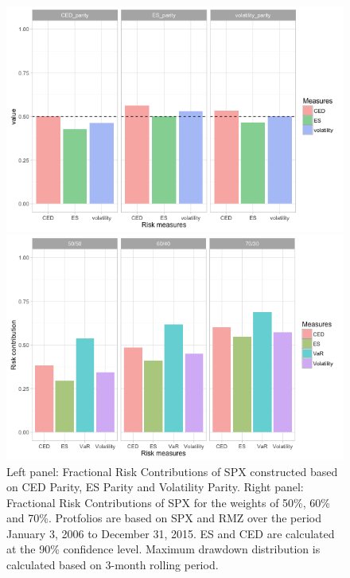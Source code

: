 \documentclass[11pt]{article}
\begin{document}
\begin{figure}[H]
  \centering
  \begin{minipage}[b]{0.48\textwidth}
    \includegraphics[width = 1\textwidth]{../figures/risk_contribution/risk_parity}
  \end{minipage}
  \hfill
  \begin{minipage}[b]{0.48\textwidth}
    \includegraphics[width = 1\textwidth]{../figures/risk_contribution/overall_rc}
  \end{minipage}
  \caption{Left panel: Fractional Risk Contributions of SPX constructed based on CED Parity, ES Parity and Volatility Parity. Right panel: Fractional Risk Contributions of SPX for the weights of 50\%, 60\% and 70\%. Protfolios are based on SPX and RMZ over the period January 3, 2006 to December 31, 2015. ES and CED are calculated at the 90\% confidence level. Maximum drawdown distribution is calculated based on 3-month rolling period.}
  \label{fig:risk_parity_and_risk_rd}
\end{figure}
\end{document}
